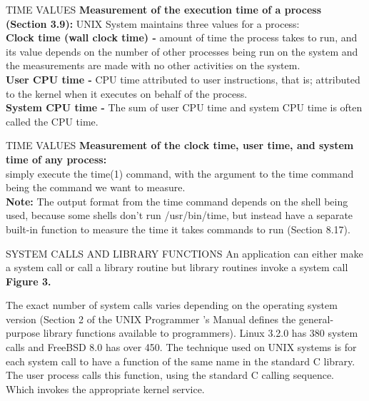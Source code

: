 \documentclass{beamer}
\begin{document}
\begin{frame}[t]{TIME VALUES}
\textbf{Measurement of  the execution time of a process (Section 3.9):}
UNIX System maintains three values for a process:
\\[6pt]\textbf{Clock time (wall clock time) -} amount of time the process takes to run, and its value depends on the number of other processes being run on the system and the measurements are made with no other activities on the system.
\\[3pt]\textbf{User CPU time -} CPU time attributed to user instructions, that is; attributed to the kernel when it executes on behalf of the process. 
\\[3pt]\textbf{System CPU time -} The sum of user CPU time and system CPU time is often called the CPU time.
\


\end{frame}
\begin{frame}[t]{TIME VALUES}
\textbf{Measurement of the clock time, user time, and system time of any process:} \\[10pt] simply execute the time(1) command, with the argument to the time command being the command we want to measure.\\[6pt]
\textbf{Note:} The output format from the time command depends on the shell being used, because some shells don’t run /usr/bin/time, but instead have a separate built-in function to measure the time it takes commands to run (Section 8.17).
\end{frame}

\begin{frame}[t]{SYSTEM CALLS AND LIBRARY FUNCTIONS}
An application can either make a system call or call a library routine but library routines invoke a system call \textbf{Figure 3.}

The exact number of system  calls varies depending on the operating system version (Section 2 of the UNIX Programmer ’s Manual defines the general-purpose library functions available to programmers). Linux 3.2.0 has 380 system calls and FreeBSD 8.0 has over 450. The technique used on UNIX systems is for each system call to have a function of the same name in the standard C library. The user process calls this function, using the standard C calling sequence.  Which invokes the appropriate kernel service.

\end{frame}
\end{document}
